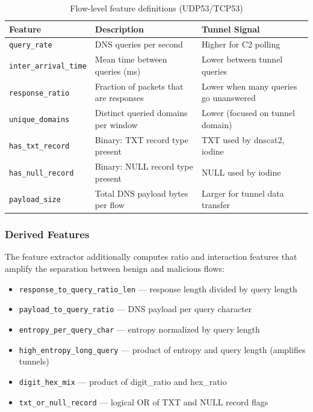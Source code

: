 \documentclass[12pt,a4paper]{article}
\begin{document}
\begin{table}[H]
\centering
\begin{tabular}{@{}lp{7cm}l@{}}
\toprule
\textbf{Feature} & \textbf{Description} & \textbf{Tunnel Signal} \\
\midrule
\texttt{query\_rate} & DNS queries per second & Higher for C2 polling \\
\texttt{inter\_arrival\_time} & Mean time between queries (ms) & Lower between tunnel queries \\
\texttt{response\_ratio} & Fraction of packets that are responses & Lower when many queries go unanswered \\
\texttt{unique\_domains} & Distinct queried domains per window & Lower (focused on tunnel domain) \\
\texttt{has\_txt\_record} & Binary: TXT record type present & TXT used by dnscat2, iodine \\
\texttt{has\_null\_record} & Binary: NULL record type present & NULL used by iodine \\
\texttt{payload\_size} & Total DNS payload bytes per flow & Larger for tunnel data transfer \\
\bottomrule
\end{tabular}
\caption{Flow-level feature definitions (UDP53/TCP53)}
\end{table}

\subsubsection{Derived Features}

The feature extractor additionally computes ratio and interaction features that amplify the separation between benign and malicious flows:

\begin{itemize}
    \item \texttt{response\_to\_query\_ratio\_len} --- response length divided by query length
    \item \texttt{payload\_to\_query\_ratio} --- DNS payload per query character
    \item \texttt{entropy\_per\_query\_char} --- entropy normalized by query length
    \item \texttt{high\_entropy\_long\_query} --- product of entropy and query length (amplifies tunnels)
    \item \texttt{digit\_hex\_mix} --- product of digit\_ratio and hex\_ratio
    \item \texttt{txt\_or\_null\_record} --- logical OR of TXT and NULL record flags
\end{itemize}
\end{document}
